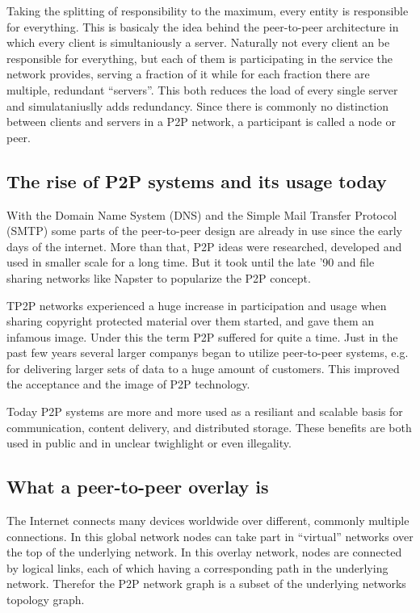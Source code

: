 Taking the splitting of responsibility to the maximum, every entity is responsible for everything. This is basicaly the idea behind the peer-to-peer architecture in which every client is simultaniously a server. Naturally not every client an be responsible for everything, but each of them is participating in the service the network provides, serving a fraction of it while for each fraction there are multiple, redundant ``servers''. This  both reduces the load of every single server and simulataniuslly adds redundancy. Since there is commonly no distinction between clients and servers in a P2P network, a participant is called a node or peer.

\subsection{The rise of P2P systems and its usage today}

With the Domain Name System (DNS) and the Simple Mail Transfer Protocol (SMTP) some parts of the peer-to-peer design are already in use since the early days of the internet. More than that, P2P ideas were researched, developed and used in smaller scale for a long time. But it took until the late '90 and file sharing networks like Napster to popularize the P2P concept.

TP2P networks experienced a huge increase in participation and usage when sharing copyright protected material over them started, and gave them an infamous image. Under this the term P2P suffered for quite a time. Just in the past few years several larger companys began to utilize peer-to-peer systems, e.g. for delivering larger sets of data to a huge amount of customers. This improved the acceptance and the image of P2P technology.

Today P2P systems are more and more used as a resiliant and scalable basis for communication, content delivery, and distributed storage. These benefits are both used in public and in unclear twighlight or even illegality. 

\subsection{What a peer-to-peer overlay is}

The Internet connects many devices worldwide over different, commonly multiple connections. In this global network nodes can take part in ``virtual'' networks over the top of the underlying network. In this overlay network, nodes are connected by logical links, each of which having a corresponding path in the underlying network. Therefor the P2P network graph is a subset of the underlying networks topology graph. 

